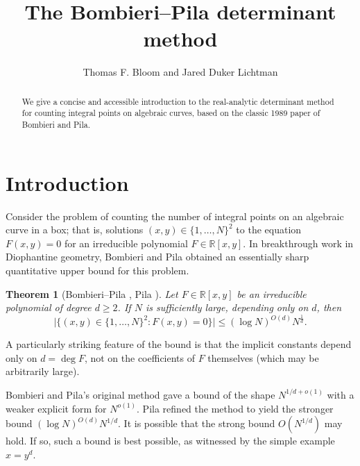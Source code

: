 \documentclass[12pt]{amsart}
\newcommand{\R}{{\mathbb R}}
\newcommand{\1}{{\mathbf 1}}
\newtheorem{theorem}{Theorem}
\theoremstyle{remark}
\theoremstyle{definition}
\begin{document}
\title{The Bombieri--Pila determinant method}
\author{Thomas F. Bloom and Jared Duker Lichtman}


\address{Mathematical Institute, University of Oxford, Oxford, OX2 6GG, UK}


\address{Department of Mathematics, Stanford University, Stanford, CA, USA}



\maketitle

\begin{abstract}
We give a concise and accessible introduction to the real-analytic determinant method for counting integral points on algebraic curves, based on the classic 1989 paper of Bombieri and Pila.
\end{abstract}


\section{Introduction}

Consider the problem of counting the number of integral points on an algebraic curve in a box; that is, solutions $(x,y)\in\{1,\ldots,N\}^2$ to the equation $F(x,y)=0$ for an irreducible polynomial $F\in \R[x,y]$. In breakthrough work in Diophantine geometry, Bombieri and Pila \cite{BP89} obtained an essentially sharp quantitative upper bound for this problem.

\begin{theorem}[Bombieri--Pila \cite{BP89}, Pila \cite{Pi96}] \label{thm:bp}
Let $F\in\mathbb{R}[x,y]$ be an irreducible polynomial of degree $d\ge2$. If $N$ is sufficiently large, depending only on $d$, then
\[\lvert \{(x,y) \in \{1,\ldots,N\}^2 :F(x,y)=0\}\rvert \le (\log N)^{O(d)}N^{\frac{1}{d}}.\]
\end{theorem}

A particularly striking feature of the bound is that the implicit constants depend only on $d=\deg F$, not on the coefficients of $F$ themselves (which may be arbitrarily large).

Bombieri and Pila's original method \cite{BP89} gave a bound of the shape $N^{1/d+o(1)}$ with a weaker explicit form for $N^{o(1)}$. Pila \cite{Pi96} refined the method to yield the stronger bound $(\log N)^{O(d)}N^{1/d}$.
It is possible that the strong bound $O(N^{1/d})$ may hold. If so, such a bound is best possible, as witnessed by the simple example $x=y^d$.
\end{document}
